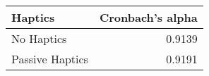 \begin{tabular}{lr}
\toprule
         Haptics &  Cronbach's alpha \\
\midrule
      No Haptics &            0.9139 \\
 Passive Haptics &            0.9191 \\
\bottomrule
\end{tabular}
